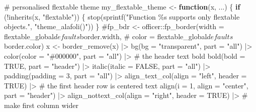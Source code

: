 \documentclass[
  letterpaper,
  DIV=11,
  numbers=noendperiod,
  oneside]{scrartcl}
\newenvironment{Shaded}{\begin{snugshade}}{\end{snugshade}}
\newcommand{\AttributeTok}[1]{\textcolor[rgb]{0.40,0.45,0.13}{#1}}
\newcommand{\CommentTok}[1]{\textcolor[rgb]{0.37,0.37,0.37}{#1}}
\newcommand{\ConstantTok}[1]{\textcolor[rgb]{0.56,0.35,0.01}{#1}}
\newcommand{\ControlFlowTok}[1]{\textcolor[rgb]{0.00,0.23,0.31}{\textbf{#1}}}
\newcommand{\DecValTok}[1]{\textcolor[rgb]{0.68,0.00,0.00}{#1}}
\newcommand{\FunctionTok}[1]{\textcolor[rgb]{0.28,0.35,0.67}{#1}}
\newcommand{\NormalTok}[1]{\textcolor[rgb]{0.00,0.23,0.31}{#1}}
\newcommand{\OtherTok}[1]{\textcolor[rgb]{0.00,0.23,0.31}{#1}}
\newcommand{\SpecialCharTok}[1]{\textcolor[rgb]{0.37,0.37,0.37}{#1}}
\newcommand{\StringTok}[1]{\textcolor[rgb]{0.13,0.47,0.30}{#1}}
\begin{document}
\begin{Shaded}
\begin{Highlighting}[]
\CommentTok{\# personalised flextable theme}
\NormalTok{my\_flextable\_theme }\OtherTok{\textless{}{-}} \ControlFlowTok{function}\NormalTok{(x, ...) \{}
    \ControlFlowTok{if}\NormalTok{ (}\SpecialCharTok{!}\FunctionTok{inherits}\NormalTok{(x, }\StringTok{"flextable"}\NormalTok{)) \{}
        \FunctionTok{stop}\NormalTok{(}\FunctionTok{sprintf}\NormalTok{(}\StringTok{"Function \textasciigrave{}\%s\textasciigrave{} supports only flextable objects."}\NormalTok{, }
            \StringTok{"theme\_alafoli()"}\NormalTok{))}
\NormalTok{    \}}
    \CommentTok{\#fp\_bdr \textless{}{-} officer::fp\_border(width = flextable\_global$defaults$border.width, }
    \CommentTok{\#  color = flextable\_global$defaults$border.color)}
\NormalTok{    x }\OtherTok{\textless{}{-}} \FunctionTok{border\_remove}\NormalTok{(x) }\SpecialCharTok{|\textgreater{}}
      \FunctionTok{bg}\NormalTok{(}\AttributeTok{bg =} \StringTok{"transparent"}\NormalTok{, }\AttributeTok{part =} \StringTok{"all"}\NormalTok{) }\SpecialCharTok{|\textgreater{}}
      \FunctionTok{color}\NormalTok{(}\AttributeTok{color =} \StringTok{"\#000000"}\NormalTok{, }\AttributeTok{part =} \StringTok{"all"}\NormalTok{) }\SpecialCharTok{|\textgreater{}}
      \CommentTok{\# the header text bold}
      \FunctionTok{bold}\NormalTok{(}\AttributeTok{bold =} \ConstantTok{TRUE}\NormalTok{, }\AttributeTok{part =} \StringTok{"header"}\NormalTok{) }\SpecialCharTok{|\textgreater{}}
      \FunctionTok{italic}\NormalTok{(}\AttributeTok{italic =} \ConstantTok{FALSE}\NormalTok{, }\AttributeTok{part =} \StringTok{"all"}\NormalTok{) }\SpecialCharTok{|\textgreater{}}
      \FunctionTok{padding}\NormalTok{(}\AttributeTok{padding =} \DecValTok{3}\NormalTok{, }\AttributeTok{part =} \StringTok{"all"}\NormalTok{) }\SpecialCharTok{|\textgreater{}}
      \FunctionTok{align\_text\_col}\NormalTok{(}\AttributeTok{align =} \StringTok{"left"}\NormalTok{, }\AttributeTok{header =} \ConstantTok{TRUE}\NormalTok{) }\SpecialCharTok{|\textgreater{}}
      \CommentTok{\# the first header row is centered text}
      \FunctionTok{align}\NormalTok{(}\AttributeTok{i =} \DecValTok{1}\NormalTok{, }\AttributeTok{align =} \StringTok{"center"}\NormalTok{, }\AttributeTok{part =} \StringTok{"header"}\NormalTok{) }\SpecialCharTok{|\textgreater{}}
      \FunctionTok{align\_nottext\_col}\NormalTok{(}\AttributeTok{align =} \StringTok{"right"}\NormalTok{, }\AttributeTok{header =} \ConstantTok{TRUE}\NormalTok{) }\SpecialCharTok{|\textgreater{}}
      \CommentTok{\# make first column wider}

\end{Highlighting}
\end{Shaded}
\end{document}
